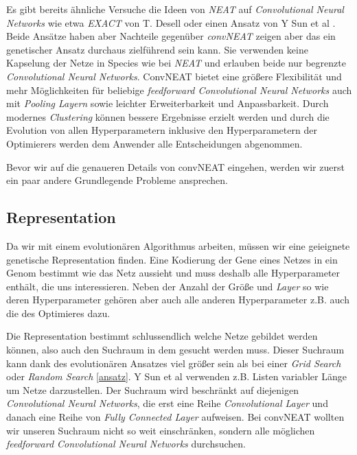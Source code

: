 \documentclass[]{scrartcl}
\begin{document}
		Es gibt bereits ähnliche Versuche die Ideen von \textit{NEAT} auf \textit{Convolutional Neural Networks} wie etwa
		\textit{EXACT} von T. Desell \cite{exact} oder einen Ansatz von Y Sun et al \cite{convoneat}.
		Beide Ansätze haben aber Nachteile gegenüber \textit{convNEAT} zeigen aber das ein genetischer Ansatz durchaus zielführend sein kann.
		Sie verwenden keine Kapselung der Netze in Species wie bei \textit{NEAT} und erlauben beide nur begrenzte \textit{Convolutional Neural Networks}.
		ConvNEAT bietet eine größere Flexibilität und mehr Möglichkeiten für beliebige \textit{feedforward Convolutional Neural Networks}
		auch mit \textit{Pooling Layern} sowie leichter Erweiterbarkeit und Anpassbarkeit. Durch modernes \textit{Clustering} können
		bessere Ergebnisse erzielt werden und durch die Evolution von allen Hyperparametern inklusive den Hyperparametern der Optimierers
		werden dem Anwender alle Entscheidungen abgenommen.
		
		Bevor wir auf die genaueren Details von convNEAT eingehen, werden wir zuerst ein paar andere Grundlegende Probleme ansprechen.

		\subsection{Representation}

			Da wir mit einem evolutionären Algorithmus arbeiten, müssen wir eine geieignete genetische Representation finden.
			Eine Kodierung der Gene eines Netzes in ein Genom bestimmt wie das Netz aussieht und muss deshalb alle Hyperparameter enthält, die uns interessieren.
			Neben der Anzahl der Größe und \textit{Layer} so wie deren Hyperparameter gehören aber auch alle anderen Hyperparameter z.B. auch
			die des Optimieres dazu.

			Die Representation bestimmt schlussendlich welche Netze gebildet werden können, also auch den Suchraum in dem gesucht werden muss.
			Dieser Suchraum kann dank des evolutionären Ansatzes viel größer sein als bei einer \textit{Grid Search} oder \textit{Random Search} \ref{ansatz}.
			Y Sun et al \cite{convoneat} verwenden z.B. Listen variabler Länge um Netze darzustellen.
			Der Suchraum wird beschränkt auf diejenigen \textit{Convolutional Neural Networks}, die erst eine Reihe \textit{Convolutional Layer}
			und danach eine Reihe von \textit{Fully Connected Layer} aufweisen.
			Bei convNEAT wollten wir unseren Suchraum nicht so weit einschränken, sondern alle möglichen \textit{feedforward Convolutional Neural Networks} durchsuchen.
\end{document}
